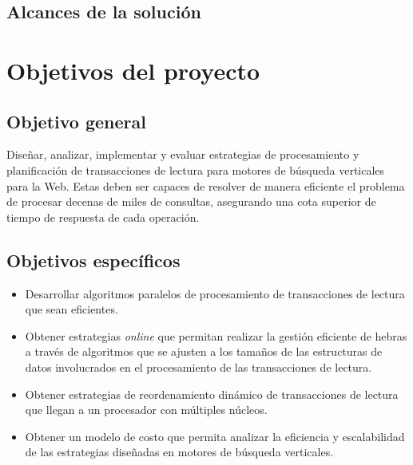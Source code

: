 \subsection{Alcances de la solución}
\label{intro:alcancesdelasolucion}

\section{Objetivos del proyecto}
\label{intro:objetivosysolucion}



\subsection{Objetivo general}
\label{intro:objetivogeneral}
Diseñar, analizar, implementar y evaluar estrategias de procesamiento y planificación de transacciones de lectura para motores de búsqueda verticales para la Web. Estas deben ser capaces de resolver de manera eficiente el problema de procesar decenas de miles de consultas, asegurando una cota superior de tiempo de respuesta de cada operación.


\subsection{Objetivos específicos}
\label{intro:objetivosespecificos}
\begin{itemize}	
	\item Desarrollar algoritmos paralelos de procesamiento de transacciones de lectura que sean eficientes.
	
	\item Obtener estrategias \textit{online} que permitan realizar la gestión eficiente de hebras a través de algoritmos que se ajusten a los tamaños de las estructuras de datos involucrados en el procesamiento de las transacciones de lectura.
    
    \item Obtener estrategias de reordenamiento dinámico de transacciones de lectura que llegan a un procesador con múltiples núcleos.
    
    \item Obtener un modelo de costo que permita analizar la eficiencia y escalabilidad de las estrategias diseñadas en motores de búsqueda verticales.
\end{itemize}
